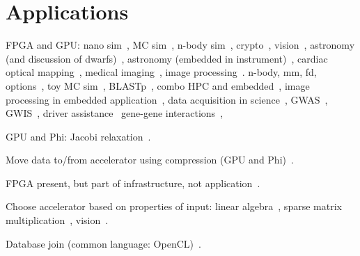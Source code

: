 \section{Applications}
\label{sec:apps}

FPGA and GPU:
nano sim~\cite{khdo06},
MC sim~\cite{shsc08,tttl10},
n-body sim~\cite{tl10},
crypto~\cite{dfg+13},
vision~\cite{bkdb10,brf14,ghgb11},
astronomy (and discussion of dwarfs)~\cite{ibs12},
astronomy (embedded in instrument)~\cite{kgb+14},
cardiac optical mapping~\cite{mjk12},
medical imaging~\cite{szb+12,sll13},
image processing~\cite{dbd+13}.
n-body, mm, fd, options~\cite{whk+14},
toy MC sim~\cite{admb14},
BLASTp~\cite{Papad14},
combo HPC and embedded~\cite{rpm+15},
image processing in embedded application~\cite{enr+18,nsg+16,zxl+18},
data acquisition in science~\cite{cab+17,vac+16},
GWAS~\cite{kws+16},
GWIS~\cite{wkhe17},
driver assistance~\cite{wlhk17}
gene-gene interactions~\cite{wkhe18},

GPU and Phi:
Jacobi relaxation~\cite{cv16}.

Move data to/from accelerator using compression (GPU and Phi)~\cite{bkp15}.

FPGA present, but part of infrastructure, not application~\cite{abb+13}.

Choose accelerator based on properties of input:
linear algebra~\cite{gchg16,sll+13},
sparse matrix multiplication~\cite{gsbh16},
vision~\cite{mfo+16}.


Database join (common language: OpenCL)~\cite{rl17}.




